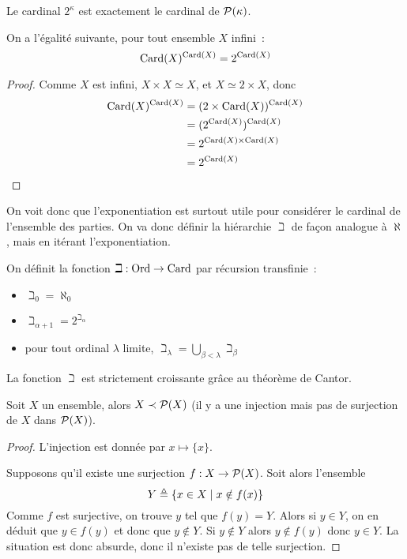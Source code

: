 \begin{remark}
  Le cardinal $2^\kappa$ est exactement le cardinal de $\mathcal{P}(\kappa)$.
\end{remark}

\begin{proposition}
  On a l'égalité suivante, pour tout ensemble $X$ infini~:
  \[\operatorname{Card}(X)^{\operatorname{Card}(X)} = 2^{\operatorname{Card}(X)}\]
\end{proposition}

\begin{proof}
  Comme $X$ est infini, $X\times X \simeq X$, et $X \simeq 2\times X$, donc
  \begin{align*}
    \operatorname{Card}(X)^{\operatorname{Card}(X)} &= (2\times\operatorname{Card}(X))^{\operatorname{Card}(X)}\\
    &= (2^{\operatorname{Card}(X)})^{\operatorname{Card}(X)} \\
    &= 2^{\operatorname{Card}(X)\times\operatorname{Card}(X)} \\
    &= 2^{\operatorname{Card}(X)}
  \end{align*}
\end{proof}

On voit donc que l'exponentiation est surtout utile pour considérer le cardinal
de l'ensemble des parties. On va donc définir la hiérarchie $\beth$ de façon
analogue à $\aleph$, mais en itérant l'exponentiation.

\begin{definition}
  On définit la fonction $\beth : \operatorname{Ord} \to \operatorname{Card}$ par récursion transfinie~:
  \begin{itemize}
  \item $\beth_0 = \aleph_0$
  \item $\beth_{\alpha + 1} = 2^{\beth_\alpha}$
  \item pour tout ordinal $\lambda$ limite,
    $\displaystyle\beth_\lambda = \bigcup_{\beta < \lambda} \beth_\beta$
  \end{itemize}
\end{definition}

La fonction $\beth$ est strictement croissante grâce au théorème de Cantor.

\begin{theorem}
  Soit $X$ un ensemble, alors $X \prec \mathcal{P}(X)$ (il y a une injection mais
  pas de surjection de $X$ dans $\mathcal{P}(X)$).
\end{theorem}

\begin{proof}
  L'injection est donnée par $x \mapsto \{x\}$.

  Supposons qu'il existe une surjection $f : X \to \mathcal{P}(X)$. Soit alors
  l'ensemble
  \[Y\triangleq \{x\in X\mid x\notin f(x)\}\]
  Comme $f$ est surjective, on trouve $y$ tel que $f(y) = Y$. Alors si
  $y\in Y$, on en déduit que $y\in f(y)$ et donc que $y\notin Y$. Si
  $y\notin Y$ alors $y\notin f(y)$ donc $y\in Y$. La situation est donc absurde,
  donc il n'existe pas de telle surjection.
\end{proof}

